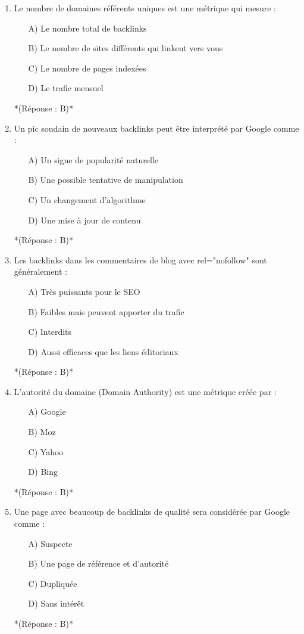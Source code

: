 \documentclass[12pt,a4paper,twoside]{report}
\begin{document}
\begin{enumerate}
\item Le nombre de domaines référents uniques est une métrique qui mesure :
\begin{itemize}
\item[A)] Le nombre total de backlinks
\item[B)] Le nombre de sites différents qui linkent vers vous
\item[C)] Le nombre de pages indexées
\item[D)] Le trafic mensuel
\end{itemize}
*(Réponse : B)*

\item Un pic soudain de nouveaux backlinks peut être interprété par Google comme :
\begin{itemize}
\item[A)] Un signe de popularité naturelle
\item[B)] Une possible tentative de manipulation
\item[C)] Un changement d'algorithme
\item[D)] Une mise à jour de contenu
\end{itemize}
*(Réponse : B)*

\item Les backlinks dans les commentaires de blog avec rel="nofollow" sont généralement :
\begin{itemize}
\item[A)] Très puissants pour le SEO
\item[B)] Faibles mais peuvent apporter du trafic
\item[C)] Interdits
\item[D)] Aussi efficaces que les liens éditoriaux
\end{itemize}
*(Réponse : B)*

\item L'autorité du domaine (Domain Authority) est une métrique créée par :
\begin{itemize}
\item[A)] Google
\item[B)] Moz
\item[C)] Yahoo
\item[D)] Bing
\end{itemize}
*(Réponse : B)*

\item Une page avec beaucoup de backlinks de qualité sera considérée par Google comme :
\begin{itemize}
\item[A)] Suspecte
\item[B)] Une page de référence et d'autorité
\item[C)] Dupliquée
\item[D)] Sans intérêt
\end{itemize}
*(Réponse : B)*


\end{enumerate}
\end{document}
